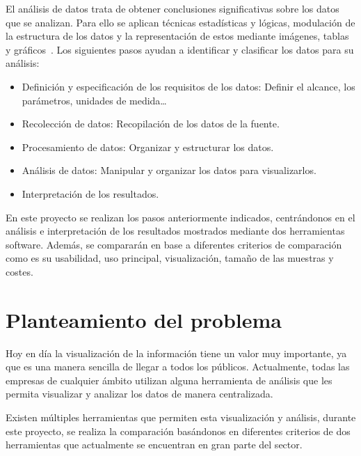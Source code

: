 \documentclass[a4paper, 12pt]{book}
\begin{document}
El análisis de datos trata de obtener conclusiones significativas sobre los datos que se analizan. Para ello se aplican técnicas estadísticas y lógicas, modulación de la estructura de los datos y la representación de estos mediante imágenes, tablas y gráficos~\cite{aranda2009tecnicas}.
Los siguientes pasos ayudan a identificar y clasificar los datos para su análisis: 
 \begin{itemize}
        \item Definición y especificación de los requisitos de los datos: Definir el alcance, los parámetros, unidades de medida\ldots
        \item Recolección de datos: Recopilación de los datos de la fuente.
        \item Procesamiento de datos: Organizar y estructurar los datos.
        \item Análisis de datos: Manipular y organizar los datos para visualizarlos.
        \item Interpretación de los resultados.
    \end{itemize}

En este proyecto se realizan los pasos anteriormente indicados, centrándonos en el análisis e interpretación de los resultados mostrados mediante dos herramientas software. Además, se compararán en base a diferentes criterios de comparación como es su usabilidad, uso principal, visualización, tamaño de las muestras y costes. 


\section{Planteamiento del problema}
\label{sec:seccion}

Hoy en día la visualización de la información tiene un valor muy importante, ya que es una manera sencilla de llegar a todos los públicos. Actualmente, todas las empresas de cualquier ámbito utilizan alguna herramienta de análisis que les permita visualizar y analizar los datos de manera centralizada. 

Existen múltiples herramientas que permiten esta visualización y análisis, durante este proyecto, se realiza la comparación basándonos en diferentes criterios de dos herramientas que actualmente se encuentran en gran parte del sector. 
\end{document}
